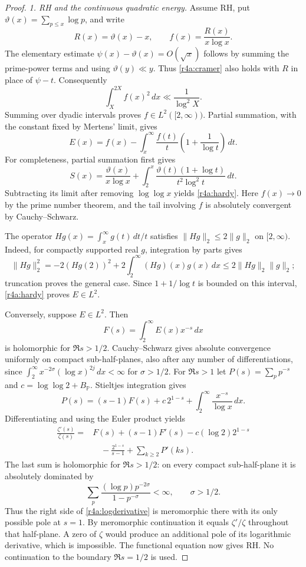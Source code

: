 \documentclass[11pt,a4paper]{article}
\theoremstyle{definition}\newtheorem{definition}[theorem]{Definition}
\theoremstyle{remark}\newtheorem{remark}[theorem]{Remark}
\numberwithin{equation}{section}
\begin{document}
\begin{proof}
\textit{1. RH and the continuous quadratic energy.}
Assume RH, put $\vartheta(x)=\sum_{p\leq x}\log p$, and write
\[
 R(x)=\vartheta(x)-x,\qquad f(x)=\frac{R(x)}{x\log x}.
\]
The elementary estimate
$\psi(x)-\vartheta(x)=O(\sqrt{x})$ follows by summing the
prime-power terms and using $\vartheta(y)\ll y$.
Thus \eqref{r4a:cramer} also holds with $R$ in place of $\psi-t$.
Consequently
\[
 \int_X^{2X}f(x)^2\,dx\ll\frac1{\log^2X}.
\]
Summing over dyadic intervals proves $f\in L^2([2,\infty))$.
Partial summation, with the constant fixed by Mertens' limit, gives
\begin{equation}\label{r4a:hardy}
 E(x)=f(x)-\int_x^\infty
        \frac{f(t)}{t}\left(1+\frac1{\log t}\right)\,dt.
\end{equation}
For completeness, partial summation first gives
\[
 S(x)=\frac{\vartheta(x)}{x\log x}
       +\int_2^x\frac{\vartheta(t)(1+\log t)}{t^2\log^2t}\,dt.
\]
Subtracting its limit after removing $\log\log x$ yields
\eqref{r4a:hardy}.  Here $f(x)\to0$ by the prime number theorem,
and the tail involving $f$ is absolutely convergent by
Cauchy--Schwarz.

The operator $Hg(x)=\int_x^\infty g(t)\,dt/t$ satisfies
$\|Hg\|_2\leq2\|g\|_2$ on $[2,\infty)$.
Indeed, for compactly supported real $g$, integration by parts gives
\[
 \|Hg\|_2^2=-2(Hg(2))^2+2\int_2^\infty(Hg)(x)g(x)\,dx
       \leq2\|Hg\|_2\|g\|_2;
\]
truncation proves the general case.  Since $1+1/\log t$ is bounded
on this interval, \eqref{r4a:hardy} proves $E\in L^2$.

Conversely, suppose $E\in L^2$.  Then
\[
 F(s)=\int_2^\infty E(x)x^{-s}\,dx
\]
is holomorphic for $\Re s>1/2$.  Cauchy--Schwarz gives absolute
convergence uniformly on compact sub-half-planes, also after any
number of differentiations, since
$\int_2^\infty x^{-2\sigma}(\log x)^{2j}\,dx<\infty$ for
$\sigma>1/2$.
For $\Re s>1$ let $P(s)=\sum_p p^{-s}$ and
$c=\log\log2+B_{\mathbb P}$.  Stieltjes integration gives
\[
 P(s)=(s-1)F(s)+c\,2^{1-s}
          +\int_2^\infty\frac{x^{-s}}{\log x}\,dx.
\]
Differentiating and using the Euler product yields
\begin{equation}\label{r4a:logderivative}
 \begin{aligned}
 \frac{\zeta'(s)}{\zeta(s)}
   ={}&F(s)+(s-1)F'(s)-c(\log2)2^{1-s}\\
      &\hspace{1em}-\frac{2^{1-s}}{s-1}
       +\sum_{k\geq2}P'(ks).
 \end{aligned}
\end{equation}
The last sum is holomorphic for $\Re s>1/2$: on every compact
sub-half-plane it is absolutely dominated by
\[
 \sum_p\frac{(\log p)p^{-2\sigma}}{1-p^{-\sigma}}<\infty,
 \qquad \sigma>1/2.
\]
Thus the right side of \eqref{r4a:logderivative} is meromorphic
there with its only possible pole at $s=1$.  By meromorphic
continuation it equals $\zeta'/\zeta$ throughout that half-plane.
A zero of $\zeta$ would produce an additional pole of its
logarithmic derivative, which is impossible.  The functional
equation now gives RH.  No continuation to the boundary
$\Re s=1/2$ is used.


\end{proof}
\end{document}
